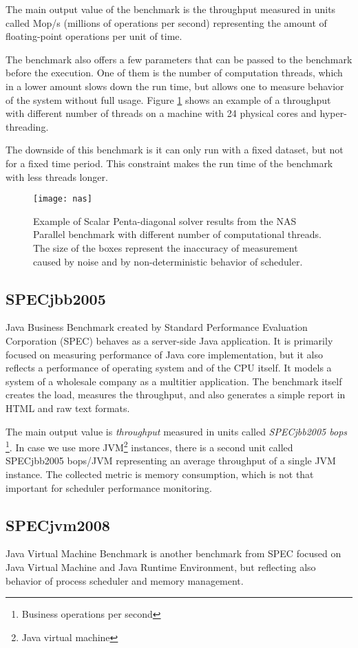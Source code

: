 The main output value of the benchmark is the throughput measured in units
called Mop/s (millions of operations per second) representing the amount of
floating-point operations per unit of time.

The benchmark also offers a few parameters that can be passed to the benchmark
before the execution. One of them is the number of computation threads, which in
a lower amount slows down the run time, but allows one to measure behavior of
the system without full usage. Figure \ref{fig:nas} shows an example of a
throughput with different number of threads on a machine with 24 physical cores
and hyper-threading.

The downside of this benchmark is it can only run with a fixed dataset, but not
for a fixed time period. This constraint makes the run time of the benchmark
with less threads longer.

\begin{figure}
  \centering
  \texttt{[image: nas]}
  \caption{Example of Scalar Penta-diagonal solver results from the NAS Parallel
    benchmark with different number of computational threads. The size of the
    boxes represent the inaccuracy of measurement caused by noise and by
    non-deterministic behavior of scheduler.}
  \label{fig:nas}
\end{figure}

\subsection{SPECjbb2005}
Java Business Benchmark\;\cite{jbb2005} created by Standard Performance
Evaluation Corporation (SPEC) behaves as a server-side Java application. It is
primarily focused on measuring performance of Java core implementation, but it
also reflects a performance of operating system and of the CPU itself. It models
a system of a wholesale company as a multitier application. The benchmark itself
creates the load, measures the throughput, and also generates a simple report in
HTML and raw text formats.

The main output value is \emph{throughput} measured in units called
\emph{SPECjbb2005 bops} \footnote{Business operations per second}. In case we
use more JVM\footnote{Java virtual machine} instances, there is a second unit
called SPECjbb2005 bops/JVM representing an average throughput of a single JVM
instance. The collected metric is memory consumption, which is not that
important for scheduler performance monitoring.

\subsection{SPECjvm2008}
Java Virtual Machine Benchmark\;\cite{jvm2008} is another benchmark from SPEC
focused on Java Virtual Machine and Java Runtime Environment, but reflecting
also behavior of process scheduler and memory management.

